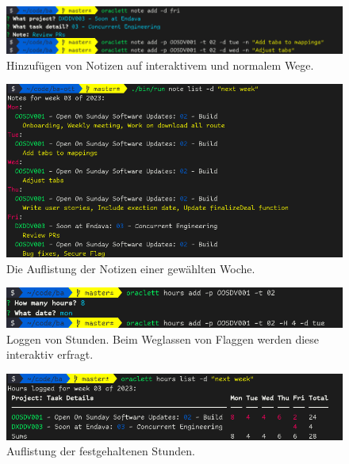 \documentclass[oneside,bibliography=totocnumbered,BCOR=5mm]{scrbook}
\begin{document}
\begin{figure}
  \centering
  \includegraphics[scale=0.5]{note-add.png}
  \caption{Hinzufügen von Notizen auf interaktivem und normalem Wege.}
  \label{fig:note-add}
\end{figure}

\begin{figure}
  \centering
  \includegraphics[scale=0.5]{note-list.png}
  \caption{Die Auflistung der Notizen einer gewählten Woche.}
  \label{fig:note-list}
\end{figure}

\begin{figure}
  \centering
  \includegraphics[scale=0.5]{hours-add.png}
  \caption{Loggen von Stunden. Beim Weglassen von Flaggen werden diese interaktiv erfragt.}
  \label{fig:hours-add}
\end{figure}

\begin{figure}
  \centering
  \includegraphics[scale=0.5]{hours-list-real.png}
  \caption{Auflistung der festgehaltenen Stunden.}
  \label{fig:hours-list}
\end{figure}
\end{document}
